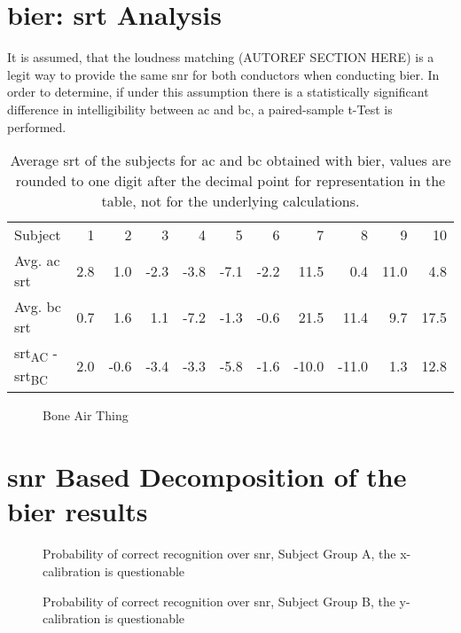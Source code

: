 \section{\gls{bier}: \gls{srt} Analysis}

It is assumed, that the loudness matching (AUTOREF SECTION HERE) is a legit way to provide the same \gls{snr} for both conductors when conducting \gls{bier}.
In order to determine, if under this assumption there is a statistically significant difference in intelligibility between \gls{ac} and \gls{bc}, a paired-sample t-Test is performed.

\begin{table}[H]
\centering
\caption{Average \gls{srt} of the subjects for \gls{ac} and \gls{bc} obtained with \gls{bier}, values are rounded to one digit after the decimal point for representation in the table, not for the underlying calculations.}
\begin{tabular}{lrrrrrrrrrr}
Subject     & 1   & 2    & 3    & 4    & 5    & 6    & 7     & 8     & 9    & 10   \\
Avg. \gls{ac} \gls{srt} & 2.8 & 1.0  & -2.3 & -3.8 & -7.1 & -2.2 & 11.5  & 0.4   & 11.0 & 4.8  \\
Avg. \gls{bc} \gls{srt} & 0.7 & 1.6  & 1.1  & -7.2 & -1.3 & -0.6 & 21.5  & 11.4  & 9.7  & 17.5 \\
\gls{srt}\textsubscript{AC} - \gls{srt}\textsubscript{BC}  & 2.0 & -0.6 & -3.4 & -3.3 & -5.8 & -1.6 & -10.0 & -11.0 & 1.3  & 12.8
\end{tabular}
\end{table}

\begin{figure}[H]
\centering

\caption{Bone Air Thing}
\label{fig:srt_normal}
\end{figure}

\section{\gls{snr} Based Decomposition of the \gls{bier} results}



\begin{figure}[H]
\centering

\caption{Probability of correct recognition over \gls{snr}, Subject Group A, the x-calibration is questionable}
\label{fig:group_A_decomp}
\end{figure}


\begin{figure}[H]
\centering

\caption{Probability of correct recognition over \gls{snr}, Subject Group B, the y-calibration is questionable}
\label{fig:group_B_decomp}
\end{figure}

